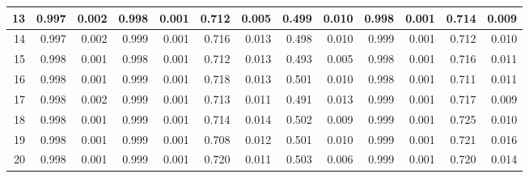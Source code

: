 \documentclass[
]{article}
\begin{document}
\begin{table}[H]
{\begin{tabular}[t]{r|r|r|r|r|r|r|r|r|r|r|r|r}
\hline
\hspace{1em}13 & 0.997 & 0.002 & 0.998 & 0.001 & 0.712 & 0.005 & 0.499 & 0.010 & 0.998 & 0.001 & 0.714 & 0.009\\
\hline
\hspace{1em}14 & 0.997 & 0.002 & 0.999 & 0.001 & 0.716 & 0.013 & 0.498 & 0.010 & 0.999 & 0.001 & 0.712 & 0.010\\
\hline
\hspace{1em}15 & 0.998 & 0.001 & 0.998 & 0.001 & 0.712 & 0.013 & 0.493 & 0.005 & 0.998 & 0.001 & 0.716 & 0.011\\
\hline
\hspace{1em}16 & 0.998 & 0.001 & 0.999 & 0.001 & 0.718 & 0.013 & 0.501 & 0.010 & 0.998 & 0.001 & 0.711 & 0.011\\
\hline
\hspace{1em}17 & 0.998 & 0.002 & 0.999 & 0.001 & 0.713 & 0.011 & 0.491 & 0.013 & 0.999 & 0.001 & 0.717 & 0.009\\
\hline
\hspace{1em}18 & 0.998 & 0.001 & 0.999 & 0.001 & 0.714 & 0.014 & 0.502 & 0.009 & 0.999 & 0.001 & 0.725 & 0.010\\
\hline
\hspace{1em}19 & 0.998 & 0.001 & 0.999 & 0.001 & 0.708 & 0.012 & 0.501 & 0.010 & 0.999 & 0.001 & 0.721 & 0.016\\
\hline
\hspace{1em}20 & 0.998 & 0.001 & 0.999 & 0.001 & 0.720 & 0.011 & 0.503 & 0.006 & 0.999 & 0.001 & 0.720 & 0.014\\
\hline
\end{tabular}}
\end{table}
\end{document}
